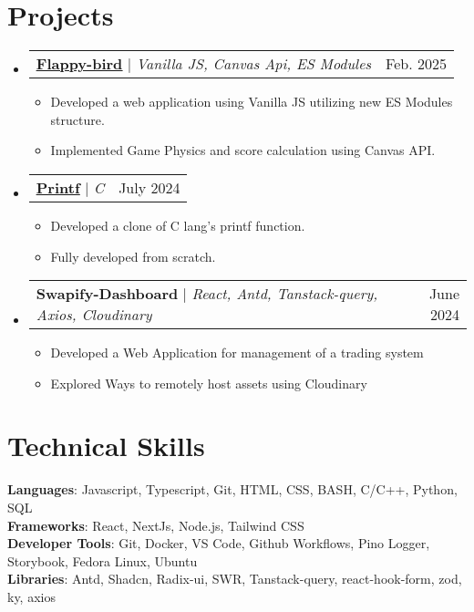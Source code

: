 \documentclass[letterpaper,11pt]{article}
\makeatletter
\newcommand{\resumeItem}[1]{
  \item\small{
    {#1 \vspace{-2pt}}
  }
}
\newcommand{\resumeSubheading}[4]{
  \vspace{-2pt}\item
    \begin{tabular*}{0.97\textwidth}[t]{l@{\extracolsep{\fill}}r}
      \textbf{#1} & #2 \\
      \textit{\small#3} & \textit{\small #4} \\
    \end{tabular*}\vspace{-7pt}
}
\newcommand{\resumeProjectHeading}[2]{
    \item
    \begin{tabular*}{0.97\textwidth}{l@{\extracolsep{\fill}}r}
      \small#1 & #2 \\
    \end{tabular*}\vspace{-7pt}
}
\newcommand{\resumeSubHeadingListStart}{\begin{itemize}[leftmargin=0.15in, label={}]}
\newcommand{\resumeSubHeadingListEnd}{\end{itemize}}
\newcommand{\resumeItemListStart}{\begin{itemize}}
\newcommand{\resumeItemListEnd}{\end{itemize}\vspace{-5pt}}
\makeatother
\begin{document}



\section{Projects}
    \resumeSubHeadingListStart
      \resumeProjectHeading
          {\textbf{\href{https://antonious-awad.github.io/flappy-bird/}{\underline{Flappy-bird}}} $|$ \emph{Vanilla JS, Canvas Api, ES Modules}}{Feb. 2025}
          \resumeItemListStart
            \resumeItem{Developed a web application using Vanilla JS utilizing new ES Modules structure.}
            \resumeItem{Implemented Game Physics and score calculation using Canvas API.}
          \resumeItemListEnd
      \resumeProjectHeading
          {\textbf{\href{https://github.com/Antonious-Awad/printf}{\underline{Printf}}} $|$ \emph{C}}{July 2024}
          \resumeItemListStart
            \resumeItem{Developed a clone of C lang's printf function.}
            \resumeItem{Fully developed from scratch.}
          \resumeItemListEnd
      \resumeProjectHeading
          {\textbf{Swapify-Dashboard} $|$ \emph{React, Antd, Tanstack-query, Axios, Cloudinary}}{June 2024}
          \resumeItemListStart
            \resumeItem{Developed a Web Application for management of a trading system }
            \resumeItem{Explored Ways to remotely host assets using Cloudinary}
          \resumeItemListEnd
    \resumeSubHeadingListEnd



%
\section{Technical Skills}
 \begin{itemize}[leftmargin=0.15in, label={}]
    \small{\item{
     \textbf{Languages}{: Javascript, Typescript, Git, HTML, CSS, BASH, C/C++, Python, SQL} \\
     \textbf{Frameworks}{: React, NextJs, Node.js, Tailwind CSS } \\
     \textbf{Developer Tools}{: Git, Docker, VS Code, Github Workflows, Pino Logger, Storybook, Fedora Linux, Ubuntu} \\
     \textbf{Libraries}{: Antd, Shadcn, Radix-ui, SWR, Tanstack-query, react-hook-form, zod, ky, axios}
    }}
 \end{itemize}


\end{document}
